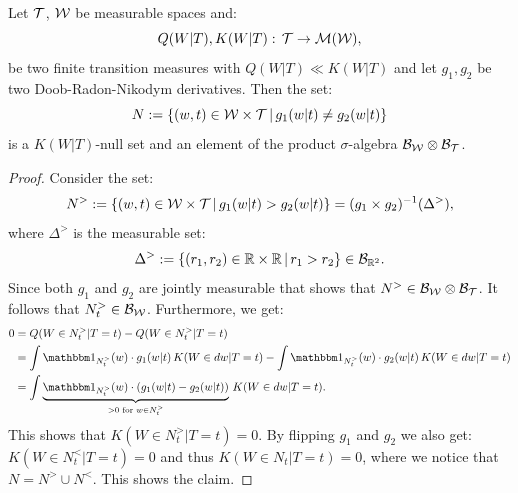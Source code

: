 \begin{Lem}
    \label{lem:doob-radon-nikodym-unique}
    Let $\mathcal{T}$, $\mathcal{W}$ be measurable spaces and:
    \[ Q(W|T), K(W|T) :\, \mathcal{T} \to \mathcal{M}(\mathcal{W}), \]
    be two finite transition measures with $Q(W|T) \ll K(W|T)$ and let $g_1,g_2$ be two Doob-Radon-Nikodym derivatives. 
    Then the set:
    \[ N:=\left \{ (w,t) \in \mathcal{W} \times \mathcal{T} \,\middle|\, g_1(w|t) \neq g_2(w|t) \right \} \]
    is a $K(W|T)$-null set and an element of the product $\sigma$-algebra $\mathcal{B}_{\mathcal{W}}\otimes\mathcal{B}_{\mathcal{T}}$.
    \begin{proof}
        Consider the set:
        \[ N^>:= \left \{ (w,t) \in \mathcal{W} \times \mathcal{T} \,\middle|\, g_1(w|t) > g_2(w|t) \right \} = (g_1 \times g_2)^{-1}(\Delta^>),\]
        where $\Delta^>$ is the measurable set:
        \[ \Delta^>:=\left \{ (r_1,r_2) \in \mathbb{R} \times \mathbb{R} \,\middle|\, r_1 >r_2 \right \}  \in \mathcal{B}_{\mathbb{R}^2}.\]
        Since both $g_1$ and $g_2$ are jointly measurable that shows that $N^> \in \mathcal{B}_{\mathcal{W}}\otimes\mathcal{B}_{\mathcal{T}}$.
        It follows that $N^>_t \in \mathcal{B}_{\mathcal{W}}$.
        Furthermore, we get:
        \begin{align*}
            0 &=   Q(W \in N^>_t|T=t) - Q(W \in N^>_t|T=t) \\
              &= \int \I_{N^>_t}(w) \cdot g_1(w|t) \, K(W \in dw|T=t) - \int \I_{N^>_t}(w) \cdot g_2(w|t) \, K(W \in dw|T=t)\\
              &= \int \underbrace{\I_{N^>_t}(w) \cdot (g_1(w|t) - g_2(w|t))}_{> 0 \text{ for }  w\in N^>_t} \, K(W \in dw|T=t).
          \end{align*}
          This shows that $K(W \in N^>_t|T=t) =0$. By flipping $g_1$ and $g_2$ we also get: $K(W \in N^<_t|T=t) =0$
          and thus $K(W \in N_t|T=t) =0$, where we notice that $N = N^> \cup N^<$.
          This shows the claim.
    \end{proof}
\end{Lem}



